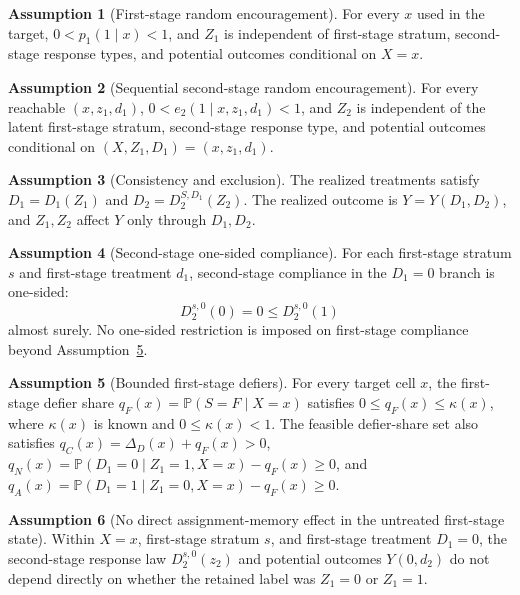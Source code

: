 \documentclass[11pt]{article}
\renewcommand{\Pr}{\mathbb{P}}
\theoremstyle{definition}
\newtheorem{assumption}{Assumption}
\theoremstyle{plain}
\theoremstyle{remark}
\begin{document}
\begin{assumption}[First-stage random encouragement]\label{ass:first-rand}
For every \(x\) used in the target, \(0<p_1(1\mid x)<1\), and \(Z_1\) is independent of first-stage stratum, second-stage response types, and potential outcomes conditional on \(X=x\).
\end{assumption}

\begin{assumption}[Sequential second-stage random encouragement]\label{ass:second-rand}
For every reachable \((x,z_1,d_1)\), \(0<e_2(1\mid x,z_1,d_1)<1\), and \(Z_2\) is independent of the latent first-stage stratum, second-stage response type, and potential outcomes conditional on \((X,Z_1,D_1)=(x,z_1,d_1)\).
\end{assumption}

\begin{assumption}[Consistency and exclusion]\label{ass:consistency}
The realized treatments satisfy \(D_1=D_1(Z_1)\) and \(D_2=D_2^{S,D_1}(Z_2)\).  The realized outcome is \(Y=Y(D_1,D_2)\), and \(Z_1,Z_2\) affect \(Y\) only through \(D_1,D_2\).
\end{assumption}

\begin{assumption}[Second-stage one-sided compliance]\label{ass:stage2-one-sided}
For each first-stage stratum \(s\) and first-stage treatment \(d_1\), second-stage compliance in the \(D_1=0\) branch is one-sided:
\[
D_2^{s,0}(0)=0\le D_2^{s,0}(1)
\]
almost surely.  No one-sided restriction is imposed on first-stage compliance beyond Assumption~\ref{ass:bounded-defiers}.
\end{assumption}

\begin{assumption}[Bounded first-stage defiers]\label{ass:bounded-defiers}
For every target cell \(x\), the first-stage defier share \(q_F(x)=\Pr(S=F\mid X=x)\) satisfies \(0\le q_F(x)\le\kappa(x)\), where \(\kappa(x)\) is known and \(0\le\kappa(x)<1\).  The feasible defier-share set also satisfies \(q_C(x)=\Delta_D(x)+q_F(x)>0\), \(q_N(x)=\Pr(D_1=0\mid Z_1=1,X=x)-q_F(x)\ge0\), and \(q_A(x)=\Pr(D_1=1\mid Z_1=0,X=x)-q_F(x)\ge0\).
\end{assumption}

\begin{assumption}[No direct assignment-memory effect in the untreated first-stage state]\label{ass:no-memory-direct}
Within \(X=x\), first-stage stratum \(s\), and first-stage treatment \(D_1=0\), the second-stage response law \(D_2^{s,0}(z_2)\) and potential outcomes \(Y(0,d_2)\) do not depend directly on whether the retained label was \(Z_1=0\) or \(Z_1=1\).
\end{assumption}
\end{document}
